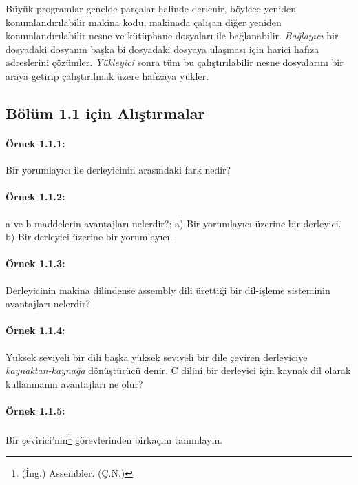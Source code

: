 \documentclass{book}
\begin{document}
Büyük programlar genelde parçalar halinde derlenir, böylece yeniden konumlandırılabilir makina kodu, makinada çalışan diğer yeniden konumlandırılabilir nesne ve kütüphane dosyaları ile bağlanabilir. \textit{Bağlayıcı} bir dosyadaki dosyanın başka bi dosyadaki dosyaya ulaşması için harici hafıza adreslerini çözümler. \textit{Yükleyici} sonra tüm bu çalıştırılabilir nesne dosyalarını bir araya getirip çalıştırılmak üzere hafızaya yükler.  

\subsection{Bölüm 1.1 için Alıştırmalar}

\paragraph{Örnek 1.1.1:} Bir yorumlayıcı ile derleyicinin arasındaki fark nedir?

\paragraph{Örnek 1.1.2:}  a ve b maddelerin avantajları nelerdir?; a) Bir yorumlayıcı üzerine bir derleyici. b) Bir derleyici üzerine bir yorumlayıcı.

\paragraph{Örnek 1.1.3:} Derleyicinin makina dilindense assembly dili ürettiği bir dil-işleme sisteminin avantajları nelerdir?

\paragraph{Örnek 1.1.4:} Yüksek seviyeli bir dili başka yüksek seviyeli bir dile çeviren derleyiciye \textit{kaynaktan-kaynağa} dönüştürücü denir. C dilini bir derleyici için kaynak dil olarak kullanmanın avantajları ne olur?

\setcounter{footnote}{0}
\paragraph{Örnek 1.1.5:}  Bir çevirici'nin\footnote{(İng.) Assembler. (Ç.N.)} görevlerinden birkaçını tanımlayın.
\end{document}

